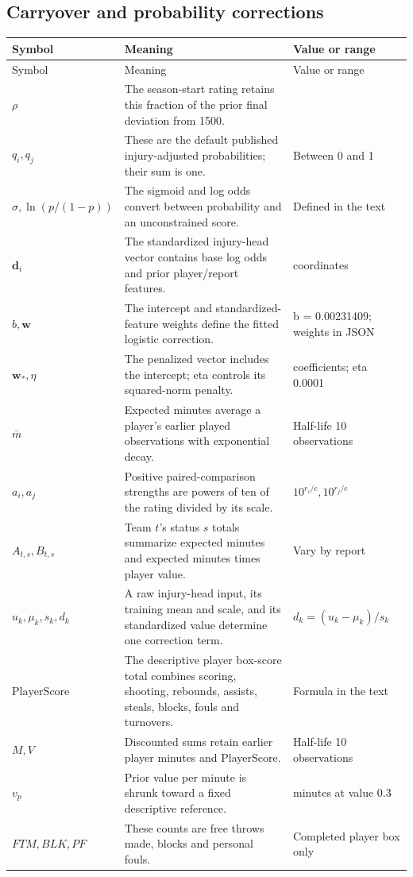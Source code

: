 \documentclass[11pt]{article}
\begin{document}
\subsection*{Carryover and probability corrections}
\begin{longtable}{@{}>{\raggedright\arraybackslash}p{}>{\raggedright\arraybackslash}p{}>{\raggedright\arraybackslash}p{}@{}}
\toprule
Symbol & Meaning & Value or range\\
\midrule
\endfirsthead
\toprule Symbol & Meaning & Value or range\\\midrule
\endhead
\bottomrule\endfoot
$\rho$ & The season-start rating retains this fraction of the prior final deviation from 1500. & 0.5\\
$q_i,q_j$ & These are the default published injury-adjusted probabilities; their sum is one. & Between 0 and 1\\
$\sigma,\ln(p/(1-p))$ & The sigmoid and log odds convert between probability and an unconstrained score. & Defined in the text\\
$\mathbf d_i$ & The standardized injury-head vector contains base log odds and prior player/report features. & 19 coordinates\\
$b,\mathbf w$ & The intercept and standardized-feature weights define the fitted logistic correction. & b = 0.00231409; weights in JSON\\
$\mathbf w_*,\eta$ & The penalized vector includes the intercept; eta controls its squared-norm penalty. & 20 coefficients; eta 0.0001\\
$\bar m$ & Expected minutes average a player's earlier played observations with exponential decay. & Half-life 10 observations\\
$a_i,a_j$ & Positive paired-comparison strengths are powers of ten of the rating divided by its scale. & $10^{r_i/c},10^{r_j/c}$\\
$A_{t,s},B_{t,s}$ & Team $t$'s status $s$ totals summarize expected minutes and expected minutes times player value. & Vary by report\\
$u_k,\mu_k,s_k,d_k$ & A raw injury-head input, its training mean and scale, and its standardized value determine one correction term. & $d_k=(u_k-\mu_k)/s_k$\\
$\mathrm{PlayerScore}$ & The descriptive player box-score total combines scoring, shooting, rebounds, assists, steals, blocks, fouls and turnovers. & Formula in the text\\
$M,V$ & Discounted sums retain earlier player minutes and PlayerScore. & Half-life 10 observations\\
$v_p$ & Prior value per minute is shrunk toward a fixed descriptive reference. & 80 minutes at value 0.3\\
$FTM,BLK,PF$ & These counts are free throws made, blocks and personal fouls. & Completed player box only\\
\end{longtable}
\end{document}
